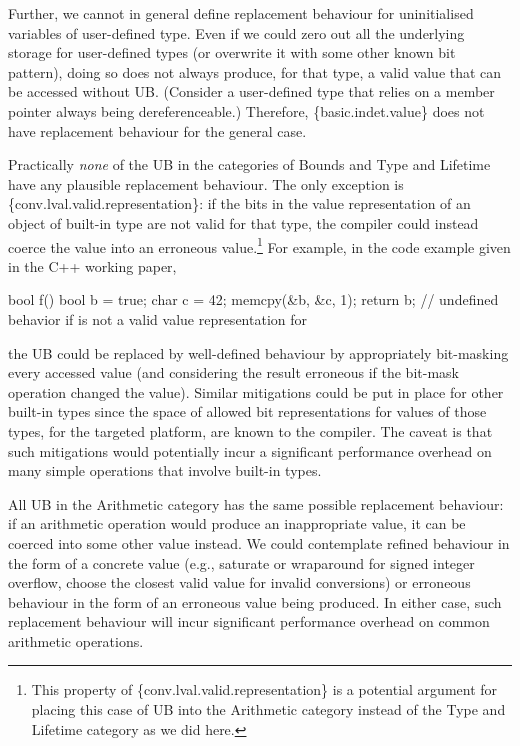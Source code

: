 Further, we cannot in general define replacement behaviour for uninitialised variables of user-defined type. Even if we could zero out all the underlying storage for user-defined types (or overwrite it with some other known bit pattern), doing so does not always produce, for that type, a valid value that can be accessed without UB. (Consider a user-defined type that relies on a member pointer always being dereferenceable.) Therefore, \{basic.indet.value\} does not have replacement behaviour for the general case.



Practically \emph{none} of the UB in the categories of Bounds and Type and Lifetime have any plausible replacement behaviour. The only exception is \{conv.lval.valid.representation\}: if the bits in the value representation of an object of built-in type are not valid for that type, the compiler could instead coerce the value into an erroneous value.\footnote{This property of \{conv.lval.valid.representation\} is a potential argument for placing this case of UB into the Arithmetic category instead of the Type and Lifetime category as we did here.} For example, in the code example given in the C++ working paper,



\begin{codeblock}
bool f() {
  bool b = true;
  char c = 42;
  memcpy(&b, &c, 1);
  return b;         // undefined behavior if  is not a valid value representation for 
}
\end{codeblock}



the UB could be replaced by well-defined behaviour by appropriately bit-masking every accessed  value (and considering the result erroneous if the bit-mask operation changed the value). Similar mitigations could be put in place for other built-in types since the space of allowed bit representations for values of those types, for the targeted platform, are known to the compiler. The caveat is that such mitigations would potentially incur a significant performance overhead on many simple operations that involve built-in types.

All UB in the Arithmetic category has the same possible replacement behaviour: if an arithmetic operation would produce an inappropriate value, it can be coerced into some other value instead. We could contemplate refined behaviour in the form of a concrete value (e.g., saturate or wraparound for signed integer overflow, choose the closest valid value for invalid conversions) or erroneous behaviour in the form of an erroneous value being produced. In either case, such replacement behaviour will incur significant performance overhead on common arithmetic operations.

